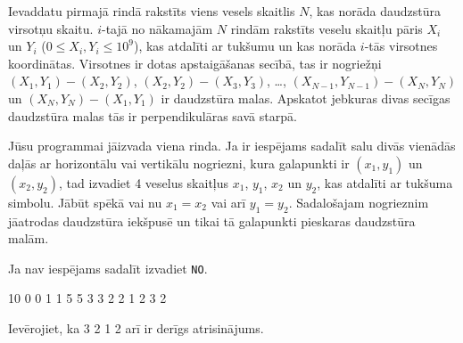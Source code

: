 \documentclass{boi2014-lv}
\newcommand{\constant}[1]{{\tt #1}}
\begin{document}
    \Input
		
		Ievaddatu pirmajā rindā rakstīts viens vesels skaitlis $N$, kas norāda daudzstūra virsotņu skaitu. $i$-tajā no nākamajām $N$ rindām rakstīts veselu skaitļu pāris $X_i$ un $Y_i$ ($0 \le X_i, Y_i \le 10^9$), kas atdalīti ar tukšumu un kas norāda $i$-tās virsotnes koordinātas. Virsotnes ir dotas apstaigāšanas secībā, tas ir nogriežņi $(X_1,Y_1) - (X_2,Y_2)$,
    $(X_2,Y_2) - (X_3,Y_3)$, \ldots, $(X_{N-1},Y_{N-1}) - (X_N,Y_N)$ un
    $(X_N,Y_N) - (X_1,Y_1)$ ir daudzstūra malas. Apskatot jebkuras divas secīgas daudzstūra malas tās ir perpendikulāras savā starpā.


	\Output
	
		Jūsu programmai jāizvada viena rinda. Ja ir iespējams sadalīt salu divās vienādās daļās ar horizontālu vai vertikālu nogriezni, kura galapunkti ir $(x_1, y_1)$ un $(x_2, y_2)$, tad izvadiet 4 veselus skaitļus $x_1$, $y_1$, $x_2$ un $y_2$, kas atdalīti ar tukšuma simbolu. Jābūt spēkā vai nu $x_1 = x_2$ vai arī $y_1 = y_2$. Sadalošajam nogrieznim jāatrodas daudzstūra iekšpusē un tikai tā galapunkti pieskaras daudzstūra malām.

	Ja nav iespējams sadalīt izvadiet	\constant{NO}.

    \Examples
	\example
	{
		10  0  0  1  1  5  5  3  3  2  2
	}
	{
		1 2 3 2
	}
	{
		Ievērojiet, ka 3 2 1 2 arī ir derīgs atrisinājums.

        \begin{center}
        \end{center}

	}
\end{document}

